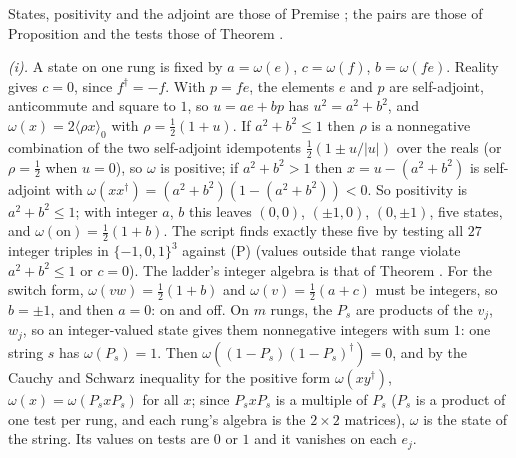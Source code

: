 States, positivity and the adjoint are those of Premise ; the pairs are those of Proposition  and the tests those of Theorem .

\emph{(i).} A state on one rung is fixed by $a = \omega(e)$, $c = \omega(f)$, $b = \omega(fe)$. Reality gives $c = 0$, since $f^{\dagger} = -f$. With $p = fe$, the elements $e$ and $p$ are self-adjoint, anticommute and square to $1$, so $u = ae + bp$ has $u^{2} = a^{2} + b^{2}$, and $\omega(x) = 2\langle\rho x\rangle_{0}$ with $\rho = \tfrac12(1 + u)$. If $a^{2} + b^{2} \le 1$ then $\rho$ is a nonnegative combination of the two self-adjoint idempotents $\tfrac12(1 \pm u/|u|)$ over the reals (or $\rho = \tfrac12$ when $u = 0$), so $\omega$ is positive; if $a^{2} + b^{2} > 1$ then $x = u - (a^{2} + b^{2})$ is self-adjoint with $\omega(xx^{\dagger}) = (a^{2} + b^{2})(1 - (a^{2} + b^{2})) < 0$. So positivity is $a^{2} + b^{2} \le 1$; with integer $a$, $b$ this leaves $(0,0)$, $(\pm 1, 0)$, $(0, \pm 1)$, five states, and $\omega(\mathrm{on}) = \tfrac12(1 + b)$. The script finds exactly these five by testing all $27$ integer triples in $\{-1, 0, 1\}^{3}$ against (P) (values outside that range violate $a^{2} + b^{2} \le 1$ or $c = 0$). The ladder's integer algebra is that of Theorem . For the switch form, $\omega(vw) = \tfrac12(1 + b)$ and $\omega(v) = \tfrac12(a + c)$ must be integers, so $b = \pm 1$, and then $a = 0$: on and off. On $m$ rungs, the $P_{s}$ are products of the $v_{j}$, $w_{j}$, so an integer-valued state gives them nonnegative integers with sum $1$: one string $s$ has $\omega(P_{s}) = 1$. Then $\omega((1 - P_{s})(1 - P_{s})^{\dagger}) = 0$, and by the Cauchy and Schwarz inequality for the positive form $\omega(xy^{\dagger})$, $\omega(x) = \omega(P_{s}xP_{s})$ for all $x$; since $P_{s}xP_{s}$ is a multiple of $P_{s}$ ($P_{s}$ is a product of one test per rung, and each rung's algebra is the $2 \times 2$ matrices), $\omega$ is the state of the string. Its values on tests are $0$ or $1$ and it vanishes on each $e_{j}$.

